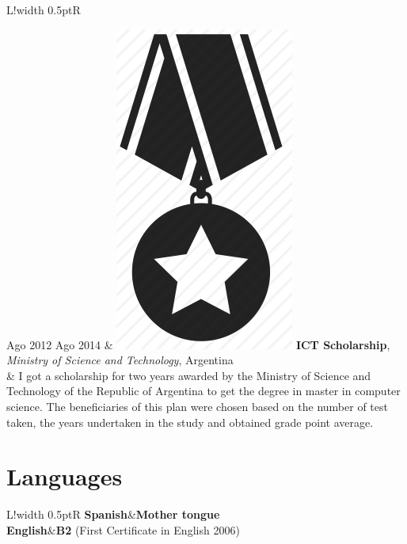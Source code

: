 \documentclass[10pt]{article}
\newcommand\VRule{\color{lightgray}\vrule width 0.5pt}
\begin{document}
\begin{tabular}{L!{\VRule}R}

Ago 2012 Ago 2014 & \includegraphics[scale=0.022]{../img/medal.png}
\textbf{ICT Scholarship}, \textit{Ministry of Science and 
Technology}, Argentina\\
& \vspace{-0.7cm} I got a scholarship for two years awarded by the Ministry of 
Science and Technology of the Republic of Argentina to
get the degree in master in computer science. The beneficiaries of this plan were chosen based on the number of test
taken, the years undertaken in the study and obtained grade point average.\\
\end{tabular}



\section*{Languages}

\begin{tabular}{L!{\VRule}R}
{\bf Spanish}&{\bf Mother tongue}\\
{\bf English}&{\bf B2} (First Certificate in English 2006)\\
\end{tabular}
\end{document}
